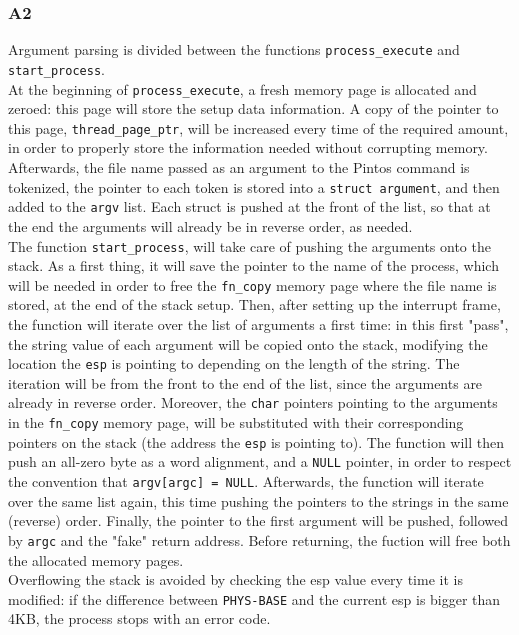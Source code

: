 \documentclass[a4wide, 11pt]{article}
\newcommand{\tx}{\texttt}
\begin{document}
\subsubsection{A2}
Argument parsing is divided between the functions \tx{process\_execute} and \tx{start\_process}. \\
At the beginning of \tx{process\_execute}, a fresh memory page is allocated and zeroed: this page will store the setup data information. A copy of the pointer to this page, \tx{thread\_page\_ptr}, will be increased every time of the required amount, in order to properly store the information needed without corrupting memory. Afterwards, the file name passed as an argument to the Pintos command is tokenized, the pointer to each token is stored into a \tx{struct argument}, and then added to the \tx{argv} list. Each struct is pushed at the front of the list, so that at the end the arguments will already be in reverse order, as needed. \\
The function \tx{start\_process}, will take care of pushing the arguments onto the stack. As a first thing, it will save the pointer to the name of the process, which will be needed in order to free the \tx{fn\_copy} memory page where the file name is stored, at the end of the stack setup. Then, after setting up the interrupt frame, the function will iterate over the list of arguments a first time: in this first "pass", the string value of each argument will be copied onto the stack, modifying the location the \tx{esp} is pointing to depending on the length of the string. The iteration will be from the front to the end of the list, since the arguments are already in reverse order. Moreover, the \tx{char} pointers pointing to the arguments in the \tx{fn\_copy} memory page, will be substituted with their corresponding pointers on the stack (the address the \tx{esp} is pointing to). The function will then push an all-zero byte as a word alignment, and a \tx{NULL} pointer, in order to respect the convention that \tx{argv[argc] = NULL}. Afterwards, the function will iterate over the same list again, this time pushing the pointers to the strings in the same (reverse) order. Finally, the pointer to the first argument will be pushed, followed by \tx{argc} and the "fake" return address. Before returning, the fuction will free both the allocated memory pages. \\
Overflowing the stack is avoided by checking the esp value every time it is modified: if the difference between \tx{PHYS-BASE} and the current esp is bigger than 4KB, the process stops with an error code.   
\end{document}
